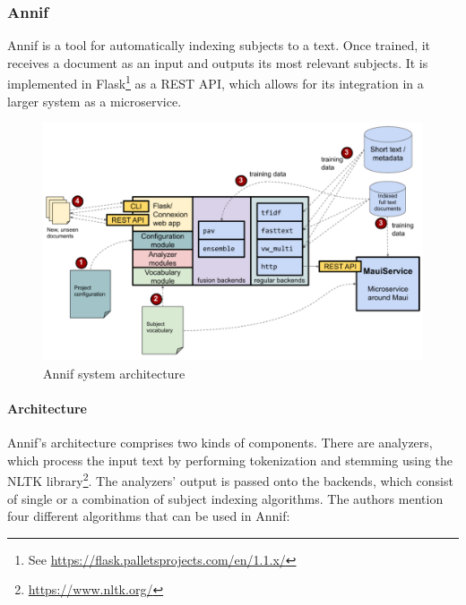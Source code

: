 \subsubsection{Annif} \label{subject_indexing_annif}

Annif \cite{suominen2019annif} is a tool for automatically indexing subjects to a text. Once trained, it receives a document as an input and outputs its most relevant subjects. It is implemented in Flask\footnote{See \url{https://flask.palletsprojects.com/en/1.1.x/}} as a REST API, which allows for its integration in a larger system as a microservice.

\begin{figure}
    \centering
    \includegraphics[width=\textwidth]{figures/related_work/annif/annif_architecture.PNG}
    \caption{Annif system architecture}
    \label{fig:annif_architecture}
\end{figure}

\paragraph{Architecture} \mbox{}

Annif's architecture comprises two kinds of components. There are analyzers, which process the input text by performing tokenization and stemming using the NLTK library\footnote{\url{https://www.nltk.org/}}. The analyzers' output is passed onto the backends, which consist of single or a combination of subject indexing algorithms. The authors mention four different algorithms that can be used in Annif:

